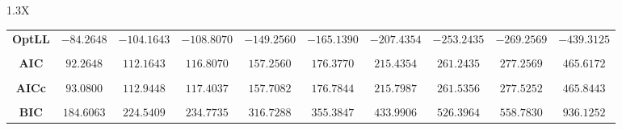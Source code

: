\documentclass[10pt]{article}
\begin{document}
{\begin{tabularx}{1.3\textwidth}{X}
{\begin{tabular}{cccccccccc}
\cmidrule(r){1-10} \\
 { {\bf OptLL} }& $-84.2648$ & $-104.1643$ & $-108.8070$ & $-149.2560$ & $-165.1390$ & $-207.4354$ & $-253.2435$& $-269.2569$& $-439.3125$ \\
\cmidrule(r){1-10} \\
 { {\bf AIC} }& $92.2648$ & $112.1643$ & $116.8070$ & $157.2560$ & $176.3770$ & $215.4354$ & $261.2435$& $277.2569$& $465.6172$ \\
\cmidrule(r){1-10} \\
 { {\bf AICc} }& $93.0800$ & $112.9448$ & $117.4037$ & $157.7082$ & $176.7844$ & $215.7987$ & $261.5356$& $277.5252$& $465.8443$ \\
\cmidrule(r){1-10} \\
 { {\bf BIC} }& $184.6063$ & $224.5409$ & $234.7735$ & $316.7288$ & $355.3847$ & $433.9906$ & $526.3964$& $558.7830$& $936.1252$ \\
\bottomrule
\end{tabular}}
\end{tabularx}}

  \vspace{3 cm}

  
\end{document}
